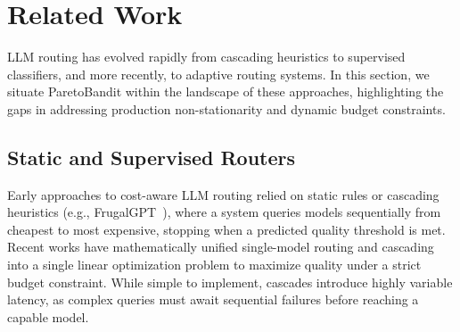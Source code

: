 \section{Related Work}
\label{sec:related}

LLM routing has evolved rapidly from cascading heuristics to supervised classifiers, and more recently, to adaptive routing systems. In this section, we situate ParetoBandit within the landscape of these approaches, highlighting the gaps in addressing production non-stationarity and dynamic budget constraints.

\subsection{Static and Supervised Routers}

Early approaches to cost-aware LLM routing relied on static rules or cascading heuristics (e.g., FrugalGPT~\cite{chen2023frugalgpt}), where a system queries models sequentially from cheapest to most expensive, stopping when a predicted quality threshold is met. Recent works have mathematically unified single-model routing and cascading into a single linear optimization problem to maximize quality under a strict budget constraint. While simple to implement, cascades introduce highly variable latency, as complex queries must await sequential failures before reaching a capable model. 

